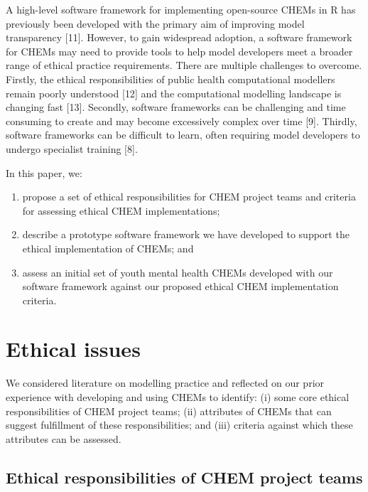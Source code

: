 \documentclass[
]{article}
\begin{document}
A high-level software framework for implementing open-source CHEMs in R has previously been developed with the primary aim of improving model transparency {[}11{]}. However, to gain widespread adoption, a software framework for CHEMs may need to provide tools to help model developers meet a broader range of ethical practice requirements. There are multiple challenges to overcome. Firstly, the ethical responsibilities of public health computational modellers remain poorly understood {[}12{]} and the computational modelling landscape is changing fast {[}13{]}. Secondly, software frameworks can be challenging and time consuming to create and may become excessively complex over time {[}9{]}. Thirdly, software frameworks can be difficult to learn, often requiring model developers to undergo specialist training {[}8{]}.

In this paper, we:

\begin{enumerate}
\def\labelenumi{(\roman{enumi})}
\item
  propose a set of ethical responsibilities for CHEM project teams and criteria for assessing ethical CHEM implementations;
\item
  describe a prototype software framework we have developed to support the ethical implementation of CHEMs; and
\item
  assess an initial set of youth mental health CHEMs developed with our software framework against our proposed ethical CHEM implementation criteria.
\end{enumerate}

\hypertarget{ethical-issues}{%
\section{Ethical issues}\label{ethical-issues}}

We considered literature on modelling practice and reflected on our prior experience with developing and using CHEMs to identify: (i) some core ethical responsibilities of CHEM project teams; (ii) attributes of CHEMs that can suggest fulfillment of these responsibilities; and (iii) criteria against which these attributes can be assessed.

\hypertarget{ethical-responsibilities-of-chem-project-teams}{%
\subsection{Ethical responsibilities of CHEM project teams}\label{ethical-responsibilities-of-chem-project-teams}}
\end{document}
